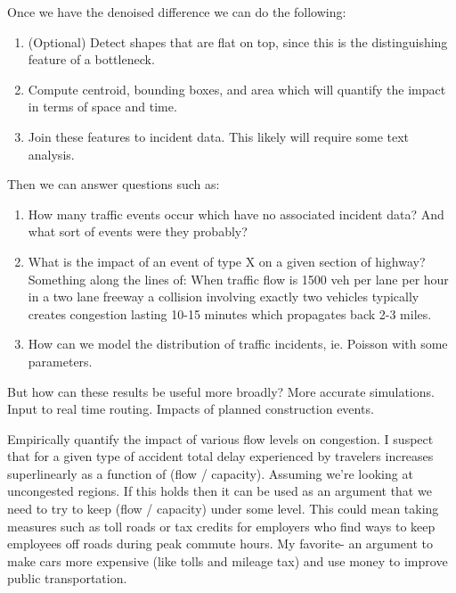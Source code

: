 \documentclass[12pt]{article}
\begin{document}
Once we have the denoised difference we can do the following:
\begin{enumerate}
    \item (Optional) Detect shapes that are flat on top, since this is the
        distinguishing feature of a bottleneck.
    \item Compute centroid, bounding boxes, and area which will quantify the impact
        in terms of space and time.
    \item Join these features to incident data. This likely will require some text
        analysis.
\end{enumerate}

Then we can answer questions such as:
\begin{enumerate}
    \item How many traffic events occur which have no associated incident
        data? And what sort of events were they probably?
    \item What is the impact of an event of type X on a given section of
        highway? Something along the lines of: When traffic flow is 1500
        veh per lane per hour in a two lane freeway a collision involving
        exactly two vehicles typically creates congestion lasting 10-15
        minutes which propagates back 2-3 miles. 
    \item How can we model the distribution of traffic incidents, ie.
        Poisson with some parameters.
\end{enumerate}

But how can these results be useful more broadly? More accurate
simulations. Input to real time routing. Impacts of planned construction
events.

Empirically quantify the impact of various flow levels on congestion.
I suspect that for a given type of accident total delay experienced by
travelers increases superlinearly as a function of (flow / capacity).
Assuming we're looking at uncongested regions. If this holds then it can be
used as an argument that we need to try to keep (flow / capacity) under
some level. This could mean taking measures such as toll roads or tax
credits for employers who find ways to keep employees off roads during peak
commute hours. My favorite- an argument to make cars more expensive (like
tolls and mileage tax) and use money to improve public transportation.

 


\end{document}
